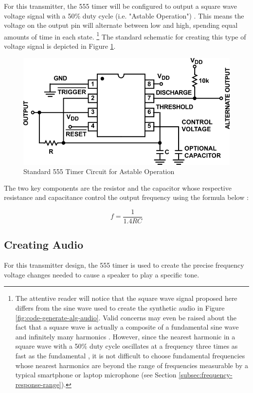 For this transmitter, the 555 timer will be configured to output a square wave voltage signal with a 50\% duty cycle (i.e. "Astable Operation") \cite{icm7555}.
This means the voltage on the output pin will alternate between low and high, spending equal amounts of time in each state.
\footnote{
    The attentive reader will notice that the square wave signal proposed here differs from the sine wave used to create the synthetic audio in Figure \ref{fig:code-generate-alg-audio}.
    Valid concerns may even be raised about the fact that a square wave is actually a composite of a fundamental sine wave and infinitely many harmonics \cite{harmonics}.
    However, since the nearest harmonic in a square wave with a 50\% duty cycle oscillates at a frequency three times as fast as the fundamental \cite{square-waves}, it is not difficult to choose fundamental frequencies whose nearest harmonics are beyond the range of frequencies measurable by a typical smartphone or laptop microphone (see Section \ref{subsec:frequency-response-range}).
}
The standard schematic for creating this type of voltage signal is depicted in Figure \ref{fig:555_astable}.

\begin{figure}[h]
    \centering
    \caption{Standard 555 Timer Circuit for Astable Operation \cite{icm7555}}
    \label{fig:555_astable}
    \includegraphics[width=0.75\linewidth]{Figures/6 PCB Design/555_astable.png}
\end{figure}

The two key components are the resistor  and the capacitor  whose respective resistance and capacitance control the output frequency  using the formula below \cite{icm7555}:

\[f = \frac{1}{1.4 R C}\]

\subsection{Creating Audio}
For this transmitter design, the 555 timer is used to create the precise frequency voltage changes needed to cause a speaker to play a specific tone.

